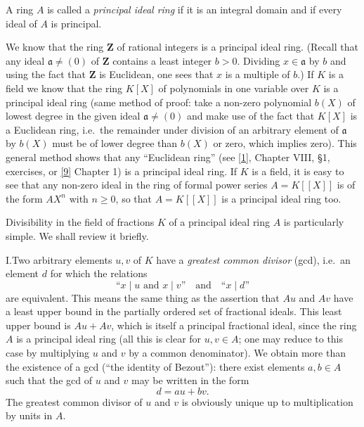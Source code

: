 \begin{definition}\label{def:I.1.1}
A ring $A$ is called a \emph{principal ideal ring} if it is an integral
domain and if every ideal of $A$ is principal.
\end{definition}

We know that the ring $\mathbf{Z}$ of rational integers is a principal ideal
ring. (Recall that any ideal $\mathfrak{a}\neq(0)$ of $\mathbf{Z}$ contains a
least integer $b>0$. Dividing $x\in\mathfrak{a}$ by $b$ and using the fact
that $\mathbf{Z}$ is Euclidean, one sees that $x$ is a multiple of $b$.) If
$K$ is a field we know that the ring $K[X]$ of polynomials in one variable
over $K$ is a principal ideal ring (same method of proof: take a non-zero
polynomial $b(X)$ of lowest degree in the given ideal
$\mathfrak{a}\neq(0)$ and make use of the fact that $K[X]$ is a Euclidean
ring, i.e.\ the remainder under division of an arbitrary element of
$\mathfrak{a}$ by $b(X)$ must be of lower degree than $b(X)$ or zero, which
implies zero). This general method shows that any ``Euclidean ring'' (see
\hyperref[bib:1]{[1]}, Chapter VIII, §1, exercises, or \hyperref[bib:9]{[9]} Chapter 1) is a principal ideal
ring. If $K$ is a field, it is easy to see that any non-zero ideal in the
ring of formal power series $A=K[[X]]$ is of the form $AX^{n}$ with
$n\geqslant0$, so that $A=K[[X]]$ is a principal ideal ring too.

Divisibility in the field of fractions $K$ of a principal ideal ring $A$ is
particularly simple. We shall review it briefly.

\medskip
\noindent I.\quad Two arbitrary elements $u,v$ of $K$ have a \emph{greatest
common divisor} (gcd), i.e.\ an element $d$ for which the relations
\begin{equation}
\text{``}x\mid u\text{ and }x\mid v\text{''}\quad\text{and}\quad
\text{``}x\mid d\text{''}
\label{eq:I.1.1}
\end{equation}
are equivalent. This means the same thing as the assertion that $Au$ and
$Av$ have a least upper bound in the partially ordered set of fractional
ideals. This least upper bound is $Au+Av$, which is itself a principal
fractional ideal, since the ring $A$ is a principal ideal ring (all this is
clear for $u,v\in A$; one may reduce to this case by multiplying $u$ and $v$
by a common denominator). We obtain more than the existence of a gcd (``the
identity of Bezout''): there exist elements $a,b\in A$ such that the gcd of
$u$ and $v$ may be written in the form
\begin{equation}
d=au+bv.
\label{eq:I.1.2}
\end{equation}
The greatest common divisor of $u$ and $v$ is obviously unique up to
multiplication by units in $A$.

